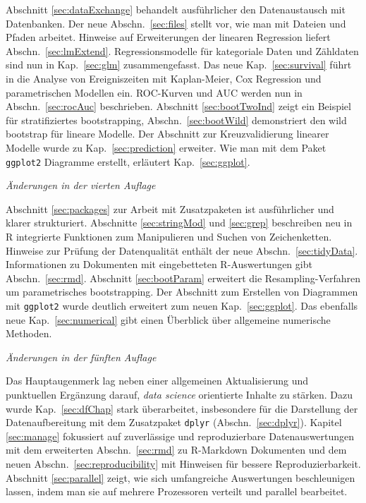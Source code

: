 Abschnitt \ref{sec:dataExchange} behandelt ausführlicher den Datenaustausch mit Datenbanken. Der neue  Abschn.\ \ref{sec:files} stellt vor, wie man mit Dateien und Pfaden arbeitet. Hinweise auf Erweiterungen der linearen Regression liefert Abschn.\ \ref{sec:lmExtend}. Regressionsmodelle für kategoriale Daten und Zähldaten sind nun in Kap.\ \ref{sec:glm} zusammengefasst. Das neue Kap.\ \ref{sec:survival} führt in die Analyse von Ereigniszeiten mit Kaplan-Meier, Cox Regression und parametrischen Modellen ein. ROC-Kurven und AUC werden nun in Abschn.\ \ref{sec:rocAuc} beschrieben. Abschnitt \ref{sec:bootTwoInd} zeigt ein Beispiel für stratifiziertes bootstrapping, Abschn.\ \ref{sec:bootWild} demonstriert den wild bootstrap für lineare Modelle. Der Abschnitt zur Kreuzvalidierung linearer Modelle wurde zu Kap.\ \ref{sec:prediction} erweiter. Wie man mit dem Paket \lstinline!ggplot2! Diagramme erstellt, erläutert Kap.\ \ref{sec:ggplot}.

\textit{Änderungen in der vierten Auflage}

Abschnitt \ref{sec:packages} zur Arbeit mit Zusatzpaketen ist ausführlicher und klarer strukturiert. Abschnitte \ref{sec:stringMod} und \ref{sec:grep} beschreiben neu in R integrierte Funktionen zum Manipulieren und Suchen von Zeichenketten. Hinweise zur Prüfung der Datenqualität enthält der neue Abschn.\ \ref{sec:tidyData}. Informationen zu Dokumenten mit eingebetteten R-Auswertungen gibt Abschn.\ \ref{sec:rmd}. Abschnitt \ref{sec:bootParam} erweitert die Resampling-Verfahren um parametrisches bootstrapping. Der Abschnitt zum Erstellen von Diagrammen mit \lstinline!ggplot2! wurde deutlich erweitert zum neuen Kap.\ \ref{sec:ggplot}. Das ebenfalls neue Kap.\ \ref{sec:numerical} gibt einen Überblick über allgemeine numerische Methoden.

\textit{Änderungen in der fünften Auflage}

Das Hauptaugenmerk lag neben einer allgemeinen Aktualisierung und punktuellen Ergänzung darauf, \emph{data science} orientierte Inhalte zu stärken. Dazu wurde Kap.\ \ref{sec:dfChap} stark überarbeitet, insbesondere für die Darstellung der Datenaufbereitung mit dem Zusatzpaket \lstinline!dplyr! (Abschn.\ \ref{sec:dplyr}). Kapitel \ref{sec:manage} fokussiert auf zuverlässige und reproduzierbare Datenauswertungen mit dem erweiterten Abschn.\ \ref{sec:rmd} zu R-Markdown Dokumenten und dem neuen Abschn.\ \ref{sec:reproducibility} mit Hinweisen für bessere Reproduzierbarkeit. Abschnitt \ref{sec:parallel} zeigt, wie sich umfangreiche Auswertungen beschleunigen lassen, indem man sie auf mehrere Prozessoren verteilt und parallel bearbeitet.

